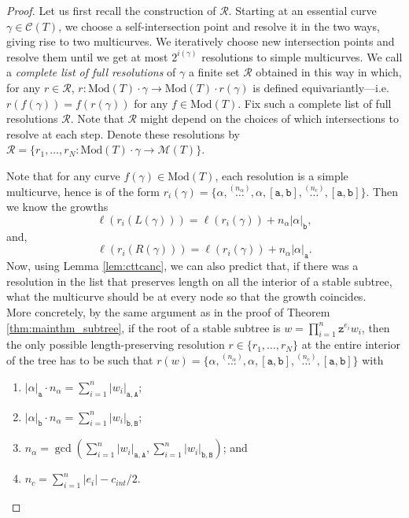 \documentclass{article}
\begin{document}
	\begin{proof}
		Let us first recall the construction of $\mathcal{R}$. Starting at an essential curve $\gamma\in\mathcal{C}(T)$, we choose a self-intersection point and resolve it in the two ways, giving rise to two multicurves. We iteratively choose new intersection points and resolve them until we get at most $2^{i(\gamma)}$ resolutions to simple multicurves. We call a \emph{complete list of full resolutions} of $\gamma$ a finite set $\mathcal{R}$ obtained in this way in which, for any $r\in \mathcal{R}$, $r:\mathrm{Mod}(T)\cdot \gamma \to \mathrm{Mod}(T)\cdot r(\gamma)$ is defined equivariantly---i.e. $r(f(\gamma))=f(r(\gamma))$ for any $f\in\mathrm{Mod}(T)$. 
		Fix such a complete list of full resolutions $\mathcal{R}$. Note that $\mathcal{R}$ might depend on the choices of which intersections to resolve at each step.
		Denote these resolutions by $\mathcal{R}=\{r_1,\hdots, r_N:\mathrm{Mod}(T)\cdot \gamma\to \mathcal{M}(T)\}$.
		
		Note that for any curve $f(\gamma)\in \mathrm{Mod}(T)$, each resolution is a simple multicurve, hence is of the form $r_i(\gamma)=\{\alpha,\overset{(n_\alpha)}{\hdots},\alpha, [\mathtt{a},\mathtt{b}],\overset{(n_c)}{\hdots},[\mathtt{a},\mathtt{b}]\}$. Then we know the growths \[\ell(r_i(L(\gamma)))=\ell(r_i(\gamma))+n_\alpha|\alpha|_{\mathtt{b}},\]
		and, 
		\[
		\ell(r_i(R(\gamma)))=\ell(r_i(\gamma))+n_\alpha|\alpha|_{\mathtt{a}}.
		\]
		Now, using Lemma \ref{lem:cttcanc}, we can also predict that, if there was a resolution in the list that preserves length on all the interior of a stable subtree, what the multicurve should be at every node so that the growth coincides.\\
		
		More concretely, by the same argument as in the proof of Theorem \ref{thm:mainthm_subtree}, if the root of a stable subtree is $w=\prod_{i=1}^n\mathtt{z}^{e_i}w_i$, then the only possible length-preserving resolution $r\in\{r_1,\hdots, r_N\}$ at the entire interior of the tree has to be such that $r(w)=\{\alpha,\overset{(n_\alpha)}{\hdots},\alpha, [\mathtt{a},\mathtt{b}],\overset{(n_c)}{\hdots},[\mathtt{a},\mathtt{b}]\}$  with
		\begin{enumerate}
			\item 
			
			$|\alpha|_\mathtt{a}\cdot n_\alpha=\sum_{i=1}^n|w_i|_{\mathtt{a},\mathtt{A}}$;
			\item $|\alpha|_\mathtt{b}\cdot n_\alpha=\sum_{i=1}^n|w_i|_{\mathtt{b},\mathtt{B}}$;
			\item $n_\alpha=\gcd(\sum_{i=1}^n|w_i|_{\mathtt{a},\mathtt{A}},\sum_{i=1}^n|w_i|_{\mathtt{b},\mathtt{B}})$; and
			\item $n_c=\sum_{i=1}^n|e_i|-c_{int}/2$.
		\end{enumerate}
		

\end{proof}
\end{document}
